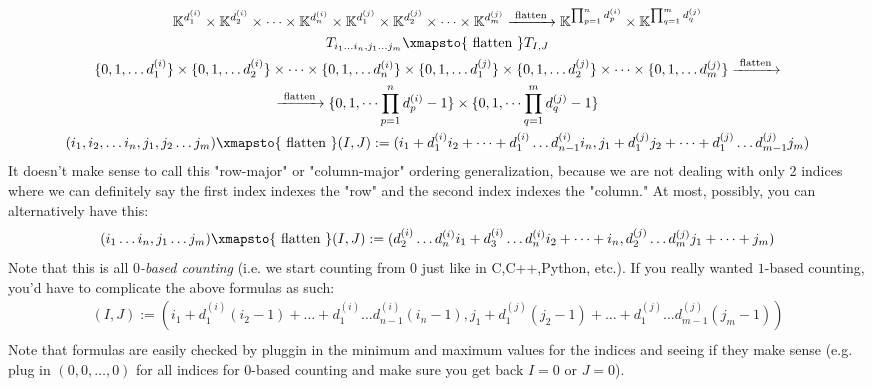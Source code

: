 \begin{equation}
\begin{gathered}
	\mathbb{K}^{d_1^{(i)} } \times \mathbb{K}^{d_2^{(i)} } \times \dots \times \mathbb{K}^{d_n^{(i)} } \times \mathbb{K}^{d_1^{(j)} } \times \mathbb{K}^{d_2^{(j)} } \times \dots \times \mathbb{K}^{d_m^{(j)} } \xrightarrow{ \text{ flatten } } \mathbb{K}^{ \prod_{p=1}^n d_p^{(i)} } \times \mathbb{K}^{ \prod_{q=1}^m d_q^{(j)} }   \\
T_{i_1 \dots i_n, j_1 \dots j_m } \xmapsto{ \text{ flatten } } T_{I,J}   \\
\lbrace 0 ,1, \dots d_1^{(i)} \rbrace \times \lbrace 0 ,1, \dots d_2^{(i)} \rbrace \times \dots \times \lbrace 0 ,1, \dots d_n^{(i)} \rbrace \times \lbrace 0 ,1, \dots d_1^{(j)} \rbrace \times \lbrace 0 ,1, \dots d_2^{(j)} \rbrace \times \dots \times \lbrace 0 ,1, \dots d_m^{(j)} \rbrace \xrightarrow{ \text{ flatten } } \\
\xrightarrow{ \text{ flatten } }  \lbrace 0 ,1, \dots  \prod_{p=1}^n d_p^{(i)} -1 \rbrace \times \lbrace 0 ,1, \dots \prod_{q=1}^m d_q^{(j)} - 1 \rbrace  \\
(i_1,i_2, \dots i_n, j_1,j_2 \dots j_m ) \xmapsto{ \text{ flatten } } (I,J) := (i_1 + d_1^{(i)} i_2 + \dots + d_1^{(i)} \dots d_{n-1}^{(i)} i_n ,j_1 + d_1^{(j)} j_2 + \dots + d_1^{(j)} \dots d_{m-1}^{(j)} j_m ) \\ 
\end{gathered}
\end{equation}
It doesn't make sense to call this "row-major" or "column-major" ordering generalization, because we are not dealing with only 2 indices where we can definitely say the first index indexes the "row" and the second index indexes the "column."  At most, possibly, you can alternatively have this:
\[
(i_1 \dots i_n,j_1\dots j_m) \xmapsto{ \text{ flatten } } (I,J) := (d_2^{(i)} \dots d_n^{(i)}i_1 + d_3^{(i)} \dots d_n^{(i)} i_2 + \dots + i_n , d_2^{(j)} \dots d_m^{(j)} j_1 + \dots + j_m )
\]
Note that this is all \emph{$0$-based counting} (i.e. we start counting from $0$ just like in C,C++,Python, etc.).  If you really wanted $1$-based counting, you'd have to complicate the above formulas as such:
\[
\begin{gathered}
(I,J) := (i_1 + d_1^{(i)} (i_2-1) + \dots + d_1^{(i)} \dots d_{n-1}^{(i)} (i_n-1) ,j_1 + d_1^{(j)} (j_2-1) + \dots + d_1^{(j)} \dots d_{m-1}^{(j)} (j_m-1) ) \\ 
\end{gathered}
\]
Note that formulas are easily checked by pluggin in the minimum and maximum values for the indices and seeing if they make sense (e.g. plug in $(0,0,\dots ,0)$ for all indices for $0$-based counting and make sure you get back $I=0$ or $J=0$).  

